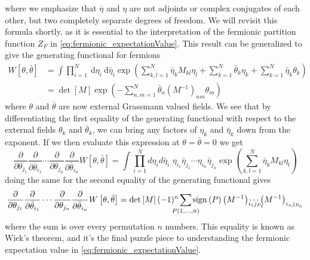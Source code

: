 \documentclass[a4paper,10pt]{article}
\begin{document}
where we emphasize that $\bar{\eta}$ and $\eta$ are not adjoints or complex conjugates of each other, but two completely separate degrees of freedom. We will revisit this formula shortly, as it is essential to the interpretation of the fermionic partition function $Z_F$ in \eqref{eq:fermionic_expectationValue}.
This result can be generalized to give the generating functional for fermions
\begin{equation}
\begin{aligned}
W[\theta, \bar{\theta}] &=\int \prod_{i=1}^{N} \mathrm{~d} \eta_{i} \mathrm{~d} \bar{\eta}_{i} \exp \left(\sum_{k, l=1}^{N} \bar{\eta}_{k} M_{k l} \eta_{l}+\sum_{k=1}^{N} \bar{\theta}_{k} \eta_{k}+\sum_{k=1}^{N} \bar{\eta}_{k} \theta_{k}\right) \\
&=\operatorname{det}[M] \exp \left(-\sum_{n, m=1}^{N} \bar{\theta}_{n}\left(M^{-1}\right)_{n m} \theta_{m}\right)
\end{aligned}
\end{equation}
where $\theta$ and $\bar{\theta}$ are now external Grassmann valued fields. We see that by differentiating the first equality of the generating functional with respect to the external fields $\theta_k$ and $\bar{\theta}_k$, we can bring any factors of $\eta_k$ and $\bar{\eta}_k$ down from the exponent. If we then evaluate this expression at $\theta = \bar{\theta}=0$ we get
\begin{equation}\label{eq:f_exp_val_from_generatingFunctional}
\frac{\partial}{\partial \theta_{j_1}}\frac{\partial}{\partial \bar{\theta}_{i_1}}\cdots\frac{\partial}{\partial \theta_{j_n}}\frac{\partial}{\partial \bar{\theta}_{i_n}}W\left[ \theta,\bar{\theta} \right]=\int \prod_{i=1}^{N} d\eta_{i} d\bar{\eta}_{i} \,\, \eta_{i_1}\bar{\eta}_{j_1}\cdots\eta_{i_n}\bar{\eta}_{j_n}\exp \left(\sum_{k, l=1}^{N} \bar{\eta}_{k} M_{k l} \eta_{l}\right)
\end{equation}
doing the same for the second equality of the generating functional gives
\begin{equation}\label{eq:F_exp_val_as_permutations_of_propagators}
\frac{\partial}{\partial \theta_{j_1}}\frac{\partial}{\partial \bar{\theta}_{i_1}}\cdots\frac{\partial}{\partial \theta_{j_n}}\frac{\partial}{\partial \bar{\theta}_{i_n}}W\left[ \theta,\bar{\theta} \right]=\operatorname{det}\left[ M \right](-1)^n \mkern-18mu\sum\limits_{P(1,\ldots,n)}\mkern-18mu\operatorname{sign}\left( P \right)\left( M^{-1} \right)_{i_1j_{P_1}}\mkern-18mu\mkern-18mu\cdots\left( M^{-1} \right)_{i_nj_{P_n}}
\end{equation}
where the sum is over every permutation $n$ numbers.
This equality is known as Wick's theorem, and it's the final puzzle piece to understanding the fermionic expectation value in \eqref{eq:fermionic_expectationValue}.
\end{document}
